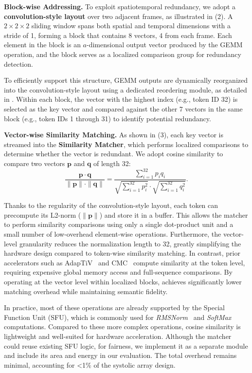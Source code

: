 \textbf{Block-wise Addressing.}  
To exploit spatiotemporal redundancy, we adopt a \textbf{convolution-style layout} over two adjacent frames, as illustrated in (2). 
{A $2 \times 2 \times 2$ sliding window spans both spatial and temporal dimensions with a stride of 1, forming a block that contains 8 vectors, 4 from each frame. 
Each element in the block is an $a$-dimensional output vector produced by the GEMM operation, and the block serves as a localized comparison group for redundancy detection.}

To efficiently support this structure, GEMM outputs are dynamically reorganized into the convolution-style layout using a dedicated reordering module, as detailed in . 
Within each block, the vector with the highest index (e.g., token ID 32) is selected as the key vector and compared against the other 7 vectors in the same block (e.g., token IDs 1 through 31) to identify potential redundancy.

\textbf{Vector-wise Similarity Matching.}  
As shown in (3), each key vector is streamed into the \textbf{Similarity Matcher}, which performs localized comparisons to determine whether the vector is redundant. 
We adopt cosine similarity to compare two vectors $\mathbf{p}$ and $\mathbf{q}$ of length 32:
\vspace{-3mm}
\[
\frac{\mathbf{p} \cdot \mathbf{q}}{\|\mathbf{p}\| \cdot \|\mathbf{q}\|} = 
\frac{\sum_{i=1}^{32} p_i q_i}{
\sqrt{\sum_{i=1}^{32} p_i^2} \cdot 
\sqrt{\sum_{i=1}^{32} q_i^2}}.
\]

Thanks to the regularity of the convolution-style layout, each token can precompute its L2-norm ($\|\mathbf{p}\|$) and store it in a buffer. 
This allows the matcher to perform similarity comparisons using only a single dot-product unit and a small number of low-overhead element-wise operations.
Furthermore, the vector-level granularity reduces the normalization length to 32, greatly simplifying the hardware design compared to token-wise similarity matching. 
In contrast, prior accelerators such as AdapTiV~\cite{yoo2024adaptiv} and CMC~\cite{song2024cmc} compute similarity at the token level, requiring expensive global memory access and full-sequence comparisons. 
By operating at the vector level within localized blocks, \proj{} achieves significantly lower matching overhead while maintaining semantic fidelity.

In practice, most of these operations are already supported by the Special Function Unit (SFU), which is commonly used for \textit{RMSNorm}~\cite{zhang2019root} and \textit{SoftMax} computations.
Compared to these more complex operations, cosine similarity is lightweight and well-suited for hardware acceleration. 
Although the matcher could reuse existing SFU logic, for fairness, we implement it as a separate module and include its area and energy in our evaluation.
The total overhead remains minimal, accounting for {<1\%} of the systolic array design.

